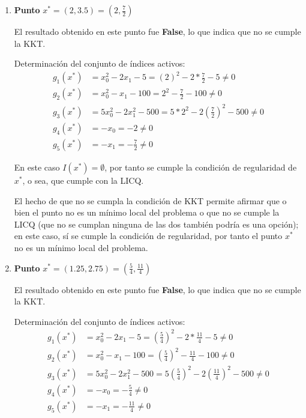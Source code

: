 \documentclass[titlepage, 11pt]{scrartcl}
\begin{document}
\begin{enumerate}
\begin{enumerate}
\begin{enumerate}
			En este caso $I(x^*)  = \emptyset$, por tanto se cumple la condici\'on de regularidad de $x^*$, o sea, que cumple con la LICQ.
			
			El hecho de que no se cumpla la condición de KKT permite afirmar que o bien el punto no es un m\'inimo local del problema o que no se cumple la LICQ (que no se cumplan ninguna de las dos también podría es una opci\'on); en este caso, s\'i se cumple la condici\'on de regularidad, por tanto el punto $x^*$ no es un m\'inimo local del problema.
			
			\item \textbf{Punto} $x^* = (2, 3.5) = (2, \frac{7}{2})$
			
			El resultado obtenido en este punto fue \textbf{False}, lo que indica que no se cumple la KKT.
			
			Determinaci\'on del conjunto de \'indices activos:
			\begin{align*}
			g_1(x^*) &= x_0^2 - 2x_1 - 5 = (2)^2 - 2* \frac{7}{2} - 5 \neq 0\\
			g_2(x^*) &= x_0^2 - x_1 - 100 = 2^2 - \frac{7}{2} - 100 \neq 0\\
			g_3(x^*) &= 5x_0^2 - 2 x_1^2 - 500 = 5 * 2^2 - 2(\frac{7}{2})^2 - 500 \neq 0\\
			g_4(x^*) &= -x_0 = -2 \neq 0\\
			g_5(x^*) &= -x_1 = -\frac{7}{2} \neq 0
			\end{align*}
			
			En este caso $I(x^*)  = \emptyset$, por tanto se cumple la condici\'on de regularidad de $x^*$, o sea, que cumple con la LICQ.
			
			El hecho de que no se cumpla la condición de KKT permite afirmar que o bien el punto no es un m\'inimo local del problema o que no se cumple la LICQ (que no se cumplan ninguna de las dos también podría es una opci\'on); en este caso, s\'i se cumple la condici\'on de regularidad, por tanto el punto $x^*$ no es un m\'inimo local del problema.
			
			\item \textbf{Punto} $x^* = (1.25, 2.75) = (\frac{5}{4}, \frac{11}{4})$

			El resultado obtenido en este punto fue \textbf{False}, lo que indica que no se cumple la KKT.
			
			Determinaci\'on del conjunto de \'indices activos:
			\begin{align*}
			g_1(x^*) &= x_0^2 - 2x_1 - 5 = (\frac{5}{4})^2 - 2* \frac{11}{4} - 5 \neq 0\\
			g_2(x^*) &= x_0^2 - x_1 - 100 = (\frac{5}{4})^2 - \frac{11}{4} - 100 \neq 0\\
			g_3(x^*) &= 5x_0^2 - 2 x_1^2 - 500 = 5 (\frac{5}{4})^2 - 2(\frac{11}{4})^2 - 500 \neq 0\\
			g_4(x^*) &= -x_0 = -\frac{5}{4} \neq 0\\
			g_5(x^*) &= -x_1 = -\frac{11}{4} \neq 0
			\end{align*}
			

\end{enumerate}
\end{enumerate}
\end{enumerate}
\end{document}

